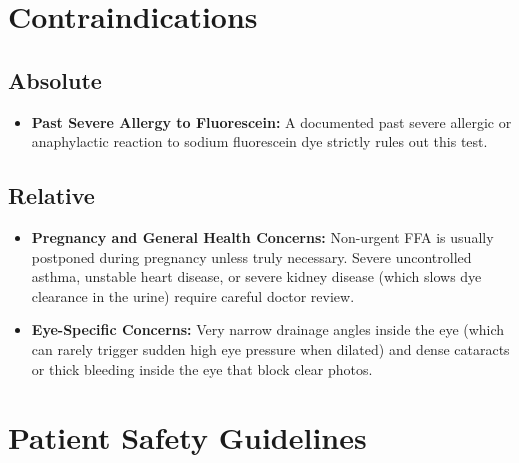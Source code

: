 \section{Contraindications}

\subsection{Absolute}

\begin{itemize}
    \item \textbf{Past Severe Allergy to Fluorescein:} A documented past severe allergic or anaphylactic reaction to sodium fluorescein dye strictly rules out this test.
\end{itemize}

\subsection{Relative}

\begin{itemize}
    \item \textbf{Pregnancy and General Health Concerns:} Non-urgent FFA is usually postponed during pregnancy unless truly necessary. Severe uncontrolled asthma, unstable heart disease, or severe kidney disease (which slows dye clearance in the urine) require careful doctor review.
    \item \textbf{Eye-Specific Concerns:} Very narrow drainage angles inside the eye (which can rarely trigger sudden high eye pressure when dilated) and dense cataracts or thick bleeding inside the eye that block clear photos.
\end{itemize}

\section{Patient Safety Guidelines}

